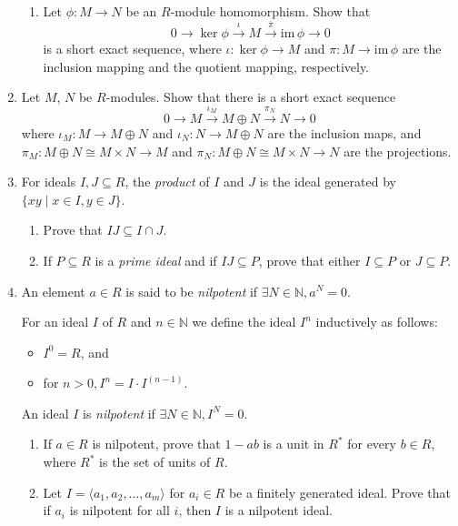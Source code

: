 \documentclass{article}
\begin{document}
\begin{enumerate}
\begin{enumerate}
    \item Let $ \phi: M \rightarrow N $ be an $ R $-module homomorphism. Show that 
    $$0 \rightarrow \ker \phi \xrightarrow{\iota} M \xrightarrow{\overline{\pi}} \text{im} \, \phi \rightarrow 0$$
    is a short exact sequence, where $ \iota: \ker \phi \rightarrow M $ and $ \pi: M \rightarrow \text{im} \, \phi $ are the inclusion mapping and the quotient mapping, respectively.
\end{enumerate}

\item
Let \( M\), $ N $ be $ R $-modules. Show that there is a short exact sequence
$$0 \rightarrow M \xrightarrow{\iota_M} M \oplus N \xrightarrow{\pi_N} N \rightarrow 0$$
where $ \iota_M: M \rightarrow M \oplus N $ and $ \iota_N: N \rightarrow M \oplus N $ are the inclusion maps, and $ \pi_M: M \oplus N \cong M \times N \rightarrow M $ and $ \pi_N: M \oplus N \cong M \times N \rightarrow N $ are the projections.

\item
For ideals $ I, J \subseteq R $, the \emph{product} of $ I $ and $ J $ is the ideal generated by $ \{xy \mid x \in I, y \in J\} $.

\begin{enumerate}
    \item Prove that $ IJ \subseteq I \cap J $.
    \item If $ P \subseteq R $ is a \emph{prime ideal} and if $ IJ \subseteq P $, prove that either $ I \subseteq P $ or $ J \subseteq P $.
\end{enumerate}

\item
An element $ a \in R $ is said to be \emph{nilpotent} if $ \exists N \in \mathbb{N}, a^N = 0 $.

For an ideal $ I $ of $ R $ and $ n \in \mathbb{N} $ we define the ideal $ I^n $ inductively as follows:

\begin{itemize}
    \item $ I^0 = R $, and 
    \item for $ n > 0, I^n = I \cdot I^{(n-1)} $.
\end{itemize}

An ideal $ I $ is \emph{nilpotent} if $ \exists N \in \mathbb{N}, I^N = 0 $.

\begin{enumerate}
    \item If $ a \in R $ is nilpotent, prove that $ 1 - ab $ is a unit in $ R^* $ for every $ b \in R $, where $ R^* $ is the set of units of $ R $.
    \item Let $ I = \langle a_1, a_2, \ldots, a_m \rangle $ for $ a_i \in R $ be a finitely generated ideal. Prove that if $ a_i $ is nilpotent for all $ i $, then $ I $ is a nilpotent ideal.
\end{enumerate}


\end{enumerate}
\end{document}
